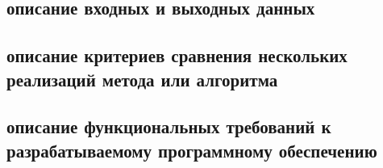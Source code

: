 \subsection{описание входных и выходных данных}

\subsection{описание критериев сравнения нескольких реализаций метода или алгоритма}

\subsection{описание функциональных требований к разрабатываемому программному
обеспечению}
